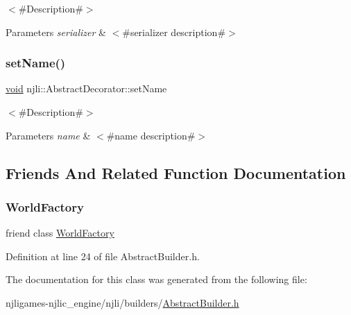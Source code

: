$<$\#\+Description\#$>$


\begin{DoxyParams}{Parameters}
{\em serializer} & $<$\#serializer description\#$>$ \\
\hline
\end{DoxyParams}
\mbox{\label{classnjli_1_1_abstract_builder_a087eb5f8d9f51cc476f12f1d10a3cb95}} 
\subsubsection{\texorpdfstring{set\+Name()}{setName()}}
{\footnotesize\ttfamily \mbox{\hyperlink{_thread_8h_af1e856da2e658414cb2456cb6f7ebc66}{void}} njli\+::\+Abstract\+Decorator\+::set\+Name}

$<$\#\+Description\#$>$


\begin{DoxyParams}{Parameters}
{\em name} & $<$\#name description\#$>$ \\
\hline
\end{DoxyParams}


\subsection{Friends And Related Function Documentation}
\mbox{\label{classnjli_1_1_abstract_builder_acb96ebb09abe8f2a37a915a842babfac}} 
\subsubsection{\texorpdfstring{World\+Factory}{WorldFactory}}
{\footnotesize\ttfamily friend class \mbox{\hyperlink{classnjli_1_1_world_factory}{World\+Factory}}\hspace{0.3cm}{\ttfamily [friend]}}



Definition at line 24 of file Abstract\+Builder.\+h.



The documentation for this class was generated from the following file\+:\begin{DoxyCompactItemize}
\item 
njligames-\/njlic\+\_\+engine/njli/builders/\mbox{\hyperlink{_abstract_builder_8h}{Abstract\+Builder.\+h}}\end{DoxyCompactItemize}
